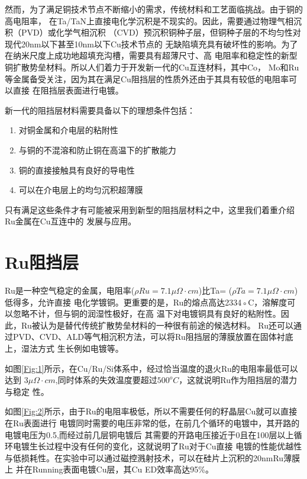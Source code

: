 \documentclass[UTF8,a4paper,12pt]{ctexart}%
\begin{document}
然而，为了满足铜技术节点不断缩小的需求，传统材料和工艺面临挑战。由于铜的高电阻率，
在Ta/TaN上直接电化学沉积是不现实的。因此，需要通过物理气相沉积（PVD）或化学气相沉积
（CVD）预沉积铜种子层，但铜种子层的不均匀性对现代20nm以下甚至10nm以下Cu技术节点的
无缺陷填充具有破坏性的影响。为了在纳米尺度上成功地超填充沟槽，需要具有超薄尺寸、高
电阻率和稳定性的新型铜扩散势垒材料。所以人们着力于开发新一代的Cu互连材料，其中Co，
Mo和Ru等金属备受关注，因为其在满足Cu阻挡层的性质外还由于其具有较低的电阻率可以直接
在阻挡层表面进行电镀。


新一代的阻挡层材料需要具备以下的理想条件包括：
\begin{enumerate}
	\item 对铜金属和介电层的粘附性
	\item 与铜的不混溶和防止铜在高温下的扩散能力
	\item 铜的直接接触具有良好的导电性
	\item 可以在介电层上的均匀沉积超薄膜
\end{enumerate}



只有满足这些条件才有可能被采用到新型的阻挡层材料之中，这里我们着重介绍Ru金属在Cu互连中的
发展与应用。

\section{Ru阻挡层}
Ru是一种空气稳定的金属，电阻率($\rho Ru =7.1\mu \Omega \cdot cm$)比Ta=
($\rho Ta =7.1\mu \Omega \cdot cm$)低得多，允许直接
电化学镀铜。更重要的是，Ru的熔点高达2334◦C，溶解度可以忽略不计，但与铜的润湿性极好，在高
温下对电镀铜具有良好的粘附性。因此，Ru被认为是替代传统扩散势垒材料的一种很有前途的候选材料。
Ru还可以通过PVD、CVD、ALD等气相沉积方法，可以将Ru阻挡层的薄膜放置在固体衬底上，湿法方式
生长例如电镀等。

如图\ref{Fig:1}所示，在Cu/Ru/Si体系中，经过恰当温度的退火Ru的电阻率最低可以达到
$3\mu \Omega \cdot cm$,同时体系的失效温度要超过$500^oC$，这就说明Ru作为阻挡层的潜力与稳定
性。


如图\ref{Fig:2}所示，由于Ru的电阻率极低，所以不需要任何的籽晶层Cu就可以直接在Ru表面进行
电镀同时需要的电压非常的低，在前几个循环的电镀中，其开路的电镀电压为0.5,而经过前几层铜电镀后
其需要的开路电压接近于0且在100层以上循环电镀生长过程中没有任何的变化，这就说明了Ru对于Cu直接
电镀的性能优越性与低损耗性。在实验中可以通过磁控溅射技术，可以在硅片上沉积的20nmRu薄膜上
并在Running表面电镀Cu层，其Cu ED效率高达95\%。
\end{document}
